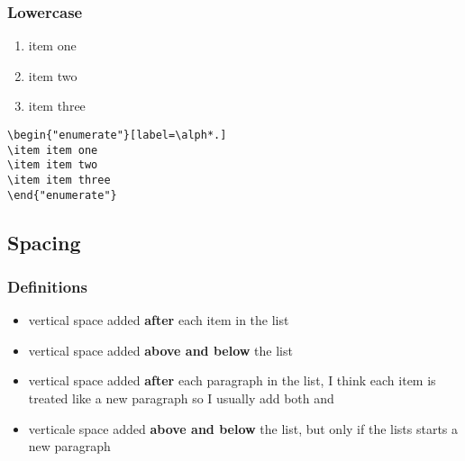 \documentclass[12pt, letterpaper]{article}
\begin{document}
\subsubsection{Lowercase}
\begin{enumerate}[label=\alph*.]
	\item item one 
	\item item two
	\item item three
\end{enumerate}
\begin{lstlisting}
\begin{"enumerate"}[label=\alph*.]
\item item one 
\item item two
\item item three
\end{"enumerate"}

\end{lstlisting}

\subsection{Spacing}
\subsubsection{Definitions}
\begin{itemize}
	\item {} vertical space added \textbf{after} each item in the list
	\item {} vertical space added \textbf{above and below} the list 
	\item {} vertical space added \textbf{after} each paragraph in the list, I think each item is treated like a new paragraph so I usually add both  and 
	\item {} verticale space added \textbf{above and below} the list, but only if the lists starts a new paragraph 
\end{itemize}
\end{document}
